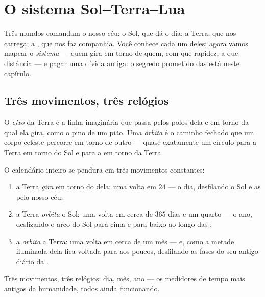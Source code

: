 \chapter{O sistema Sol--Terra--Lua}\label{ch:g6:sun-earth-moon}

Três mundos comandam o nosso céu: o Sol, que dá o dia; a Terra, que
nos carrega; a , que nos faz companhia. Você conhece cada um
deles; agora vamos mapear o \emph{sistema} --- quem gira em torno de
quem, com que rapidez, a que distância --- e pagar uma dívida antiga:
o segredo prometido das  está neste capítulo.

\section{Três movimentos, três relógios}

\begin{definition}\label{def:g6:sun-earth-moon:axisorbit}
O \emph{eixo} da Terra é a linha imaginária que passa
pelos polos dela e em torno da qual ela gira, como o pino de um
pião. Uma \emph{órbita} é o caminho fechado que um
corpo celeste percorre em torno de outro --- quase exatamente um
círculo para a Terra em torno do Sol e para a  em torno da Terra.
\end{definition}

\begin{proposition}\label{prop:g6:sun-earth-moon:motions}
O calendário inteiro se pendura em três movimentos constantes:
\begin{enumerate}
  \item a Terra \emph{gira} em torno do  dela: uma volta em $24$
         --- o dia, desfilando o Sol e as  pelo nosso
        céu;
  \item a Terra \emph{orbita} o Sol: uma volta em cerca de $365$ dias
        e um quarto --- o ano, deslizando o arco do Sol para cima e
        para baixo ao longo das ;
  \item a  \emph{orbita} a Terra: uma volta em cerca de um mês ---
        e, como a metade iluminada dela fica voltada para  aos
        poucos, desfilando as fases do seu antigo diário da .
\end{enumerate}
Três movimentos, três relógios: dia, mês, ano --- os medidores de
tempo mais antigos da humanidade, todos ainda funcionando.
\end{proposition}

